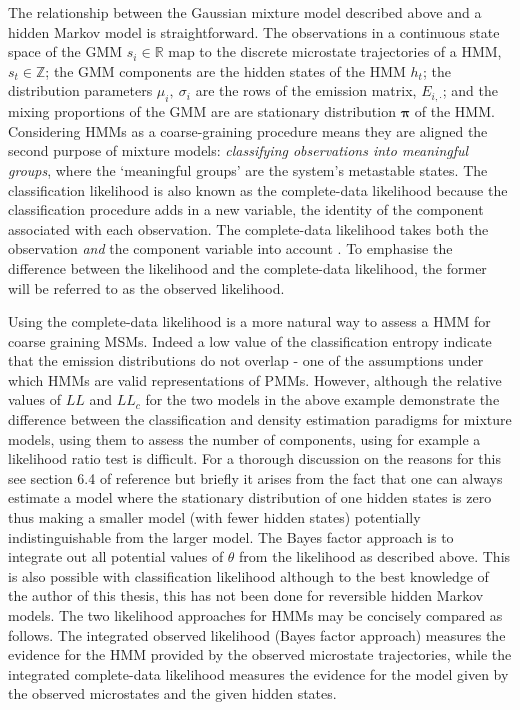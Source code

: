 The relationship between the Gaussian mixture model described above and a hidden Markov model is straightforward. The observations in a continuous state space of the GMM $s_{i} \in \mathbb{R}$ map to the discrete microstate trajectories of a HMM, $s_{t} \in \mathbb{Z}$; the GMM components are the hidden states of the HMM $h_{t}$; the distribution parameters $\mu_{i},\ \sigma_{i}$ are the rows of the emission matrix, $E_{i, \cdot}$; and the mixing proportions of the GMM are are stationary distribution $\bm{\pi}$ of the HMM. Considering HMMs as a coarse-graining procedure means they are aligned the second purpose of mixture models: \emph{classifying observations into meaningful groups}, where the `meaningful groups' are the system's metastable states. The classification likelihood is also known as the complete-data likelihood because the classification procedure adds in a new variable, the identity of the component associated with each observation. The complete-data likelihood takes both the observation \emph{and} the component variable into account \cite{mclachlan1988mixture}. To emphasise the difference between the likelihood and the complete-data likelihood, the former will be referred to as the observed likelihood.  

Using the complete-data likelihood is a more natural way to assess a HMM for coarse graining MSMs. Indeed a low value of the classification entropy indicate that the emission distributions do not overlap - one of the assumptions under which HMMs are valid representations of PMMs. However, although the relative values of $LL$ and $LL_{c}$ for the two models in the above example demonstrate the difference between the classification and density estimation paradigms for mixture models, using them to assess the number of components, using for example a likelihood ratio test \cite{wasserman2013all} is difficult. For a thorough discussion on the reasons for this see section 6.4 of reference \cite{mclachlanFiniteMixtureModels2000} but briefly it arises from the fact that one can always estimate a model where the stationary distribution of one hidden states is zero thus making a smaller model (with fewer hidden states) potentially indistinguishable from the larger model. The Bayes factor approach is to integrate out all potential values of $\theta$ from the likelihood as described above. This is also possible with classification likelihood \cite{latoucheBayesianMethodsGraph2010} although to the best knowledge of the author of this thesis, this has not been done for reversible hidden Markov models. The two likelihood approaches for HMMs may be concisely compared as follows. The integrated observed likelihood (Bayes factor approach) measures the evidence for the HMM provided by the observed microstate trajectories, while the integrated complete-data likelihood measures the evidence for the model  given by the observed microstates and the given hidden states. 

